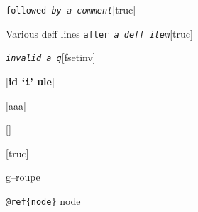 \documentclass{book}
\begin{document}
\begin{titlepage}
%
\noindent\texttt{followed \bgroup{}\normalfont{}\textsl{by a comment}\egroup{}}\hfill[truc]



%
Various deff lines
\noindent\texttt{after \bgroup{}\normalfont{}\textsl{a deff item}\egroup{}}\hfill[truc]



%

\noindent\texttt{\textsl{invalid} \bgroup{}\normalfont{}\textsl{a g}\egroup{}}\hfill[fsetinv]



%
\noindent\texttt{}\hfill[\textbf{id `\texttt{i}' ule}]




\noindent\texttt{}\hfill[aaa]



\noindent\texttt{}\hfill[]



\noindent\texttt{}\hfill[truc]




g--roupe

\texttt{@ref\{node\}} node


\end{titlepage}
\end{document}

